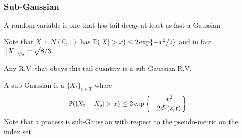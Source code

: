 \documentclass[12pt]{beamer}
\begin{document}
%
%
%
%
%
%
%

\begin{frame}[fragile]
\frametitle{Sub-Gaussian}
A  random variable is one that has tail decay at least as fast a Gaussian

\vsp
Note that $X\sim N(0,1)$ has $\P(|X| > x) \leq 2 \exp\{-x^2/2\}$ and in fact $\norm{X}_{\psi_2} = \sqrt{8/3}$

\vsp
Any R.V. that obeys this tail quantity is a sub-Gaussian R.V.

\vsp
A sub-Gaussian  is a $\{X_t\}_{t\in T}$ where
\[
\P(|X_t - X_s| > x) \leq 2\exp\left\{ -\frac{x^2}{2d^2(s,t)}\right\}
\]
Note that a process is sub-Gaussian with respect to the pseudo-metric on the index set

\end{frame}
\end{document}
